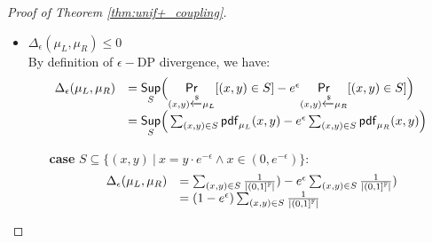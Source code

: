 \documentclass[a4paper,11pt]{article}
\begin{document}
\begin{proof}[Proof of Theorem \ref{thm:unif+_coupling}]
\begin{itemize}
\begin{itemize}
		\item $\projr(\mu_R) = \mu_2$ 
		\\
		Equivalent to show$\pdf_{\projr(\mu_R)}  = \pdf_{\mu_2}$.
		\\
		By definition of the $\projr$ and $\pdf$ of $\mu_R$, we have $\forall y \in \float$:
		\[
			\pdf_{\projr(\mu_R)}(y) = 
			\begin{cases}
			\sum_{x} 
			\frac{1}{\left \vert (0, 1]^{\float} \right \vert} 
			& x = y \cdot e^{-\epsilon} \land y \in (0, 1)\\
			\sum_{x} 
			\frac{1}{\left \vert [e^{-\epsilon}, 1]^{\float} \right \vert} 
			\cdot
			\frac{1}{\left \vert (0, 1]^{\float} \right \vert} 
			& x \in [e^{-\epsilon}, 1] \land y = 1\\
			0       & o.w.
			\end{cases} 
			= 
			\begin{cases}
			\frac{1}{\left \vert (0, 1]^{\float} \right \vert}
			& y \in (0, 1)\\
			\frac{1}{\left \vert (0, 1]^{\float} \right \vert}  
			& y = 1\\
			0       & o.w.
			\end{cases}
			=
			\pdf_{\mu_2}(y)
		\]
	\end{itemize}	
%
	\item $\Delta_{\epsilon}(\mu_L, \mu_R) \leq 0$
%
\\
	By definition of $\epsilon-$DP divergence, we have:
	 \[
	 \begin{array}{ll}
	 \Delta_{\epsilon}(\mu_L, \mu_R) 
	 & = \underset{S}{\mathsf{Sup}}
	 \Big(
	 \underset{(x,y) \xleftarrow{\$} \mu_L}{\mathsf{Pr}}[(x,y) \in S] - e^{\epsilon} \underset{(x,y) \xleftarrow{\$} \mu_R}{\mathsf{Pr}}[(x,y) \in S]
	 \Big) \\
	 & =\underset{S}{\mathsf{Sup}}
	 \Big(
	 \sum_{(x,y) \in S} \mathsf{pdf}_{\mu_L}(x, y) - e^{\epsilon} \sum_{(x,y) \in S} \mathsf{pdf}_{\mu_R}(x, y)
	 \Big)	 
	 \end{array}
	 \]
	 \begin{itemize}
	 	\item[{\bf case}]
	 	$S \subseteq \{(x, y) ~|~ 
	 	x = y \cdot e^{-\epsilon}  \land x \in (0, e^{-\epsilon}) \}$:
		\[
		 \begin{array}{ll}
		 \Delta_{\epsilon}(\mu_L, \mu_R) 
		 & = 
		 \sum_{(x,y) \in S} \frac{1}{\left \vert (0, 1]^{\mathbb{F}} \right \vert})
		 - e^{\epsilon} \sum_{(x,y) \in S} \frac{1}{\left \vert (0, 1]^{\mathbb{F}} \right \vert}) \\ 
		 & = 
		 (1 - e^{\epsilon})\sum_{(x,y) \in S} \frac{1}{\left \vert (0, 1]^{\mathbb{F}} \right \vert} 

\end{array}\]
\end{itemize}
\end{itemize}
\end{proof}
\end{document}

